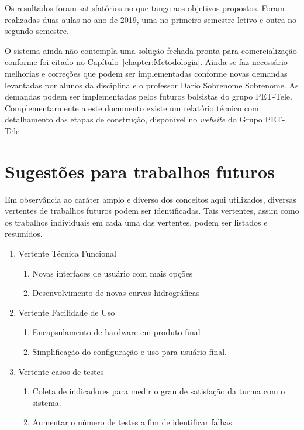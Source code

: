 \documentclass[12pt,a4paper,oneside]{book}
\begin{document}
Os resultados foram satisfatórios no que tange aos objetivos propostos. 
Foram realizadas duas aulas no ano de 2019, uma no primeiro semestre letivo e outra no segundo semestre.

O sistema ainda não contempla uma solução fechada pronta para comercialização conforme foi citado no Capítulo~\ref{chapter:Metodologia}.
%
Ainda se faz necessário melhorias e correções que podem ser implementadas conforme novas demandas levantadas por alunos da disciplina e o professor Dario Sobrenome Sobrenome.
%
As demandas podem ser implementadas pelos futuros bolsistas do grupo PET-Tele. Complementarmente a este documento existe um relatório técnico com detalhamento das etapas de construção, disponível no \textit{website} do Grupo PET-Tele~\cite{url:projeto_ladisan}


\chapter{Sugestões para trabalhos futuros}
%
\thispagestyle{empty} 
%
%
Em observância ao caráter amplo e diverso dos conceitos aqui utilizados, diversas vertentes de trabalhos futuros podem ser identificadas. Tais vertentes, assim como os trabalhos individuais em cada uma das vertentes, podem ser listados e resumidos.
%
\begin{enumerate}
    \item Vertente Técnica Funcional
        \begin{enumerate}
            \item Novas interfaces de usuário com mais opções
            \item Desenvolvimento de novas curvas hidrográficas
        \end{enumerate}
    \item Vertente Facilidade de Uso
        \begin{enumerate}
            \item Encapsulamento de hardware em produto final
            \item Simplificação do configuração e uso para usuário final.
        \end{enumerate}
    \item Vertente casos de testes
        \begin{enumerate}
            \item Coleta de indicadores para medir o grau de satisfação da turma com o sistema.
            \item Aumentar o número de testes a fim de identificar falhas.
        \end{enumerate}
\end{enumerate}
\end{document}
